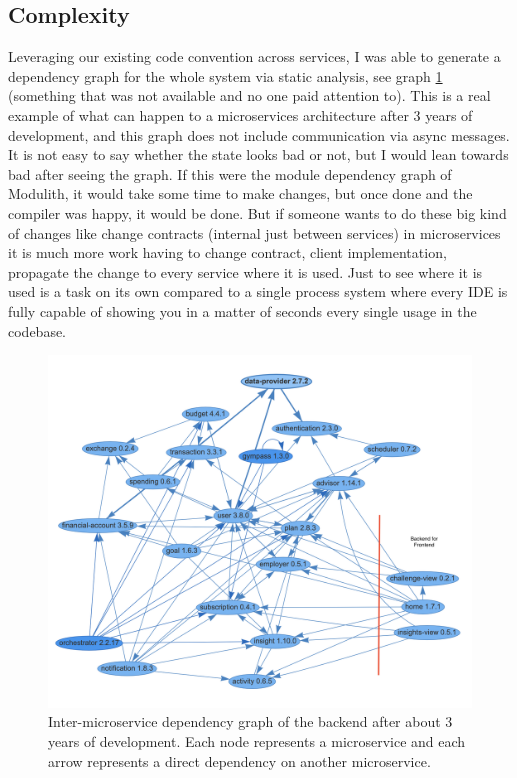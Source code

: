 \subsection{Complexity}
Leveraging our existing code convention across services, I was able to generate a dependency graph for the whole system via static analysis, see graph \ref{img:microservices-current-commented} (something that was not available and no one paid attention to). This is a real example of what can happen to a microservices architecture after 3 years of development, and this graph does not include communication via async messages. It is not easy to say whether the state looks bad or not, but I would lean towards bad after seeing the graph. If this were the module dependency graph of Modulith, it would take some time to make changes, but once done and the compiler was happy, it would be done. But if someone wants to do these big kind of changes like change contracts (internal just between services) in microservices it is much more work having to change contract, client implementation, propagate the change to every service where it is used. Just to see where it is used is a task on its own compared to a single process system where every IDE is fully capable of showing you in a matter of seconds every single usage in the codebase.


\begin{figure}
    \centering
    \includegraphics[width=\textwidth]{images/microservices-current-commented.png}
    \caption{Inter-microservice dependency graph of the backend after about 3 years of development. Each node represents a microservice and each arrow represents a direct dependency on another microservice. \label{img:microservices-current-commented}}
\end{figure}

